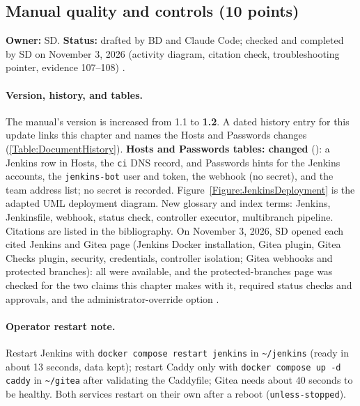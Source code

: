 \subsection{Manual quality and controls (10 points)}
\label{Section:jenkQuality}
\textbf{Owner:} SD. \textbf{Status:} drafted by BD and Claude Code; checked and completed by SD on November 3, 2026
(activity diagram, citation check, troubleshooting pointer, evidence 107--108) \StatusPass.

\paragraph{Version, history, and tables.} The manual's version is increased from 1.1 to \textbf{1.2}. A dated history entry for this update links this chapter and names
the Hosts and Passwords changes (\ref{Table:DocumentHistory}). \textbf{Hosts and Passwords tables: changed} (): a Jenkins row in Hosts,
the \texttt{ci} DNS record, and Passwords hints for the Jenkins accounts, the \texttt{jenkins-bot} user and token, the webhook (no secret), and the team address list;
no secret is recorded. Figure~\ref{Figure:JenkinsDeployment} is the adapted UML deployment diagram. New glossary and index terms: Jenkins, Jenkinsfile, webhook,
status check, controller executor, multibranch pipeline. Citations are listed in the bibliography. On November 3, 2026, SD opened each cited Jenkins and Gitea page
(Jenkins Docker installation, Gitea plugin, Gitea Checks plugin, security, credentials, controller isolation; Gitea webhooks and
protected branches): all were available, and the protected-branches page was checked for the two claims this chapter makes with it,
required status checks and approvals, and the administrator-override option \cite{GiteaProtectedBranches}.

\paragraph{Operator restart note.} Restart Jenkins with \texttt{docker compose restart jenkins} in \texttt{\textasciitilde/jenkins} (ready in about 13 seconds,
data kept); restart Caddy only with \texttt{docker compose up -d caddy} in \texttt{\textasciitilde/gitea} after validating the Caddyfile; Gitea needs about 40 seconds to be healthy.
Both services restart on their own after a reboot (\texttt{unless-stopped}).

